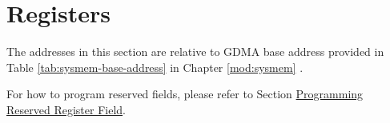 \documentclass[main\_\_EN.tex]{subfiles}
\begin{document}


\newpage
\section{Registers}

The addresses in this section are relative to GDMA base address provided in Table \ref{tab:sysmem-base-address} in Chapter \ref{mod:sysmem} \textit{}.

For how to program reserved fields, please refer to Section \hyperref[programming-reserved-field]{Programming Reserved Register Field}.


\end{document}
